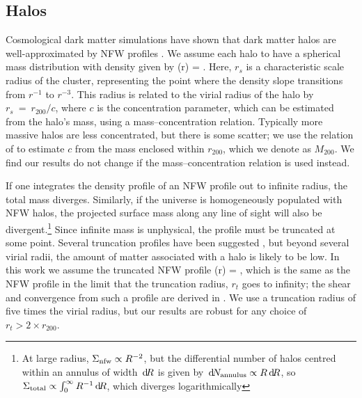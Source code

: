 \documentclass[useAMS,usenatbib,a4paper]{mn2e}
\begin{document}

\subsection{Halos}
\label{sec:model:halos}

Cosmological dark matter simulations have shown that dark matter
halos are well-approximated by NFW profiles 
\citep{NFW}. We assume each halo to have a spherical mass distribution with 
density given by
\be\label{eq:rhonfw}
\rho(r) = 
.
\ee
Here, $r_{s}$ is a characteristic scale 
radius of the cluster, representing the point where
the density slope transitions from $r^{-1}$ to $r^{-3}$. This radius is
related to the virial radius of the halo by $r_{s}~=~r_{200}/c$, where $c$ is
the concentration parameter, which can be estimated from the halo's mass,
using a mass--concentration relation. Typically more massive halos are less
concentrated, but there is some scatter; we use the relation of
\citet{Neto2007} to estimate $c$ from the mass enclosed within $r_{200}$,
which we denote as $M_{200}$. We find our results do not change if the
\citet{MaccioEtal2008} mass--concentration relation is used instead. 

If one integrates the density profile of an NFW profile out to infinite
radius, the total mass diverges. Similarly, if the universe is
homogeneously populated with NFW halos, the projected surface mass along
any line of sight will also be divergent.\footnote{At large radius,
$\Sigma_{\rm nfw} \propto R^{-2}$, but the differential number of halos
centred within an annulus of width $\, \mathrm{d} \! R$ is given by $\, \mathrm{d} \! N_{\rm
annulus} \propto R \, \mathrm{d} \! R$, so  $\Sigma_{\rm total} \propto
\int_{0}^{\infty} R^{-1} \, \mathrm{d} \! R$, which diverges logarithmically} Since
infinite mass is unphysical, the profile must be truncated at some
point. Several truncation profiles have been suggested
\citep[e.g][]{BMO}, but beyond several virial radii, the amount of
matter associated with a halo is likely to be low. In this work we
assume the truncated NFW profile
\be\label{eq:bmoprofile}
\rho(r) = 
,
\ee
which is the same as the NFW profile in the limit that the truncation
radius, $r_t$ goes to infinity; the shear and convergence from such a
profile are derived in \citet{BMO}.
 We use a truncation radius of five times
the virial radius, but our results are robust for any choice of $r_t>2
\times r_{200}$. 
\end{document}

